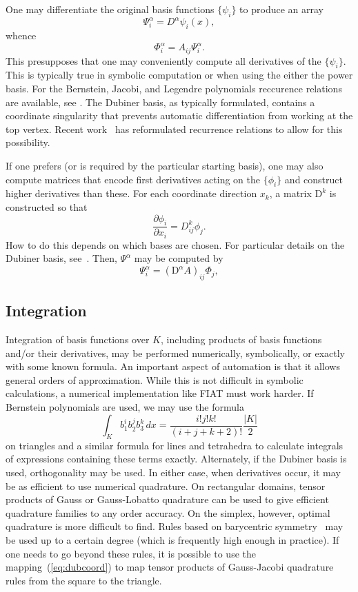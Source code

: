 One may differentiate the
original basis functions \( \{ \psi_i \} \) to produce an array
\[
\Psi^\alpha_i = D^\alpha \psi_i(x),
\]
whence
\[
\Phi^\alpha_i = A_{ij} \Psi^\alpha_i.
\]
This presupposes that one may conveniently compute all derivatives of
the \( \{ \psi_i \} \).  This is typically true in symbolic
computation or when using the either the power basis.  
For the Bernstein, Jacobi, and Legendre
 polynomials reccurence relations are
available, see \cite{KarniadakisSherwin2005,Kirby2010}.  
The Dubiner basis, as typically formulated, contains a coordinate
singularity that prevents automatic differentiation from working at
the top vertex.  Recent work~\cite{Kirby} has reformulated recurrence
relations to allow for this possibility.

If one prefers (or is required by the particular starting basis), one
may also compute matrices that encode first derivatives acting on the
\( \{ \phi_i \} \) and construct higher derivatives than these.
For each coordinate direction \( x_k \), a matrix \( \mathrm{D}^k \)
is constructed so that
\[
\frac{\partial \phi_i}{\partial x_i} =
D^k_{ij} \phi_j.
\]
How to do this depends on which bases are chosen.  For particular
details on the Dubiner basis, see~\cite{missing}.  Then, \( \Psi^\alpha \)
may be computed by
\[
\Psi^\alpha_i = (\mathrm{D}^\alpha A)_{ij} \Phi_{j},
\]

\subsection{Integration}
Integration of basis functions over \( K \), including products of
basis functions and/or their derivatives, may be performed numerically,
symbolically, or exactly with some known formula.  An important aspect
of automation is that it allows general orders of approximation.
While this is not difficult in symbolic calculations, a numerical
implementation like FIAT must work harder.  If Bernstein polynomials
are used, we may use the formula
\[
\int_K b_1^i b_2^j b_3^k \, dx = \frac{i!j!k!}{(i+j+k+2)!}\frac{|K|}{2}
\]
on triangles and a similar formula for lines and tetrahedra
to calculate integrals of expressions containing these terms exactly.  Alternately, if the Dubiner basis is used,
orthogonality may be used.  In either case, when derivatives occur, it
may be as efficient to use numerical quadrature.  On rectangular
domains, tensor products of Gauss or Gauss-Lobatto quadrature can be
used to give efficient quadrature families to any order accuracy.  On the
simplex, however, optimal quadrature is more difficult to find.
Rules based on barycentric symmetry~\cite{missing} may be used up to a
certain degree (which is frequently high enough in practice).  If one
needs to go beyond these rules, it is possible to use the
mapping~(\ref{eq:dubcoord}) to map tensor products of Gauss-Jacobi
quadrature rules from the square to the triangle.

